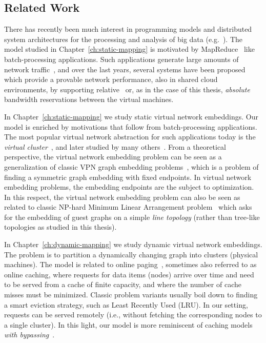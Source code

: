 \subsection{Related Work}


There has recently been much interest in programming models and distributed
system architectures for the processing and analysis of big data (e.g.~\cite{nodb,mapreduce,shark}). The model studied in
Chapter~\ref{ch:static-mapping} is motivated by MapReduce~\cite{mapreduce} like batch-processing applications.
Such applications
generate large amounts of network traffic~\cite{orchestra,talk-about,amazonbw},
and over the last years, several systems have been proposed which provide
a provable network performance, also in shared cloud environments, by supporting
relative~\cite{faircloud,elasticswitch,seawall}
or, as in the case of this thesis, \emph{absolute}~\cite{oktopus,secondnet,drl,gatekeeper,proteus} bandwidth reservations
between the virtual machines.

In Chapter~\ref{ch:static-mapping} we study static virtual network embeddings.
Our model is enriched by motivations that follow from batch-processing applications.
The most popular virtual network abstraction for such applications today is the \emph{virtual cluster}~\cite{oktopus}, and later studied by many others~\cite{talk-about,infocom16,ccr15emb,proteus}.
From a theoretical perspective, the virtual network embedding problem can be seen as a generalization
of classic VPN graph embedding problems~\cite{Goyal2008,gupta2001provisioning}, which is a problem of finding a symmetric graph embedding with fixed endpoints.
In virtual network embedding problems, the embedding endpoints are the subject to optimization.
In this respect, the virtual network embedding problem can also be seen as related to
classic NP-hard Minimum Linear Arrangement problem~\cite{mla,mla-survey} which asks for the
embedding of guest graphs on a simple \emph{line topology} (rather than tree-like topologies as
studied in this thesis).




In Chapter~\ref{ch:dynamic-mapping} we study dynamic virtual network embeddings.
The problem is to partition a dynamically changing graph into clusters (physical machines).
The model is related to online
paging~\cite{SleTar85,FKLMSY91,McGSle91,AcChNo00}, sometimes also referred to
as online caching, where requests for data items (nodes) arrive over time and
need to be served from a cache of finite capacity, and where the number of
cache misses must be minimized. Classic problem variants usually boil down to
finding a smart eviction strategy, such as Least Recently Used (LRU). In our
setting, requests can be served remotely (i.e., without fetching the
corresponding nodes to a single cluster). In this light, our model is more
reminiscent of caching models \emph{with
bypassing}~\cite{EpImLN11,EpImLN15,Irani02}.




